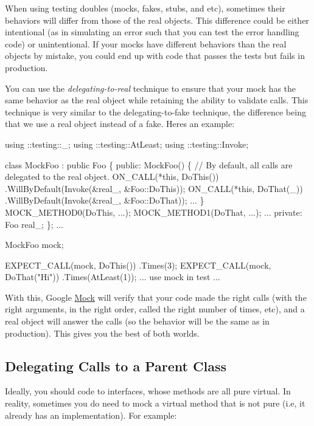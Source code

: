 When using testing doubles (mocks, fakes, stubs, and etc), sometimes their behaviors will differ from those of the real objects. This difference could be either intentional (as in simulating an error such that you can test the error handling code) or unintentional. If your mocks have different behaviors than the real objects by mistake, you could end up with code that passes the tests but fails in production.

You can use the {\itshape delegating-\/to-\/real} technique to ensure that your mock has the same behavior as the real object while retaining the ability to validate calls. This technique is very similar to the delegating-\/to-\/fake technique, the difference being that we use a real object instead of a fake. Here\textquotesingle{}s an example\+:


\begin{DoxyCode}
using ::testing::\_;
using ::testing::AtLeast;
using ::testing::Invoke;

class MockFoo : public Foo \{
 public:
  MockFoo() \{
    // By default, all calls are delegated to the real object.
    ON\_CALL(*this, DoThis())
        .WillByDefault(Invoke(&real\_, &Foo::DoThis));
    ON\_CALL(*this, DoThat(\_))
        .WillByDefault(Invoke(&real\_, &Foo::DoThat));
    ...
  \}
  MOCK\_METHOD0(DoThis, ...);
  MOCK\_METHOD1(DoThat, ...);
  ...
 private:
  Foo real\_;
\};
...

  MockFoo mock;

  EXPECT\_CALL(mock, DoThis())
      .Times(3);
  EXPECT\_CALL(mock, DoThat("Hi"))
      .Times(AtLeast(1));
  ... use mock in test ...
\end{DoxyCode}


With this, Google \hyperlink{class_mock}{Mock} will verify that your code made the right calls (with the right arguments, in the right order, called the right number of times, etc), and a real object will answer the calls (so the behavior will be the same as in production). This gives you the best of both worlds.

\subsection*{Delegating Calls to a Parent Class}

Ideally, you should code to interfaces, whose methods are all pure virtual. In reality, sometimes you do need to mock a virtual method that is not pure (i.\+e, it already has an implementation). For example\+:


